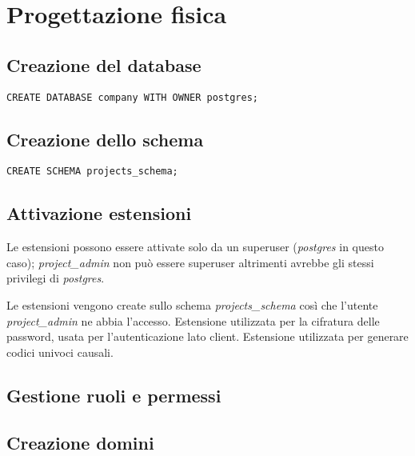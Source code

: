 \section{Progettazione fisica}
\subsection{Creazione del database}
\begin{lstlisting}
CREATE DATABASE company WITH OWNER postgres;
\end{lstlisting}

\subsection{Creazione dello schema}
\begin{lstlisting}
CREATE SCHEMA projects_schema;
\end{lstlisting}

\subsection{Attivazione estensioni}
Le estensioni possono essere attivate solo da un superuser (\textit{postgres} in questo caso); \textit{project\_admin} non può essere superuser altrimenti avrebbe gli stessi privilegi di \textit{postgres}.

Le estensioni vengono create sullo schema \textit{projects\_schema} così che l'utente \textit{project\_admin} ne abbia l'accesso.\meskip
Estensione utilizzata per la cifratura delle password, usata per l'autenticazione lato client.
\medskip
Estensione utilizzata per generare codici univoci causali.


\subsection{Gestione ruoli e permessi}

\subsection{Creazione domini}








